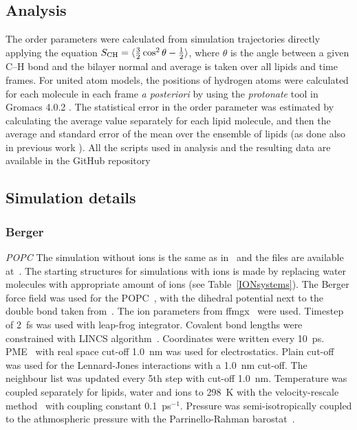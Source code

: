 \documentclass[pre,aps,floatfix,authordate1-4,twocolumn]{revtex4-1}
\begin{document}
\subsection{Analysis}
The order parameters were calculated from simulation trajectories directly applying the equation
$S_{{\rm CH}}=\langle \frac{3}{2}  \cos^2 \theta-\frac{1}{2} \rangle$,
where $\theta$ is the angle between a given C--H bond and the bilayer normal and average is taken
over all lipids and time frames. For united atom models, the positions of hydrogen atoms
were calculated for each molecule in each frame \textit{a posteriori} by using the {\it protonate} tool in 
Gromacs 4.0.2 \cite{gromacsMANUAL402}. 
The statistical error in the order parameter was estimated by calculating the average value separately for each lipid molecule,
and then the average and standard error of the mean over the ensemble of lipids (as done also in previous work \cite{botan15}).
All the scripts used in analysis and the resulting data are available in the GitHub repository \cite{githubIONpaper}

\subsection{Simulation details}

\subsubsection{Berger}
{\it POPC} The simulation without ions is the same as in~\cite{ferreira13} and the files are available at~\cite{bergerFILESpopc}. 
The starting structures for simulations with ions is made by replacing water molecules with appropriate amount of ions (see Table~\ref{IONsystems}).
The Berger force field was used for the POPC~\cite{berger97}, with the dihedral potential next to the double bond 
taken from~\cite{bachar04}. The ion parameters from ffmgx~\cite{straatsma88} were used.
Timestep of 2~fs was used with leap-frog integrator. Covalent bond lengths were constrained with LINCS algorithm~\cite{hess97,hess07}. 
Coordinates were written every 10~ps. PME~\cite{darden93,essman95} with real space cut-off 1.0~nm was used 
for electrostatics. Plain cut-off was used for the Lennard-Jones interactions with a 1.0~nm cut-off.
The neighbour list was updated every 5th step with cut-off 1.0~nm. Temperature was coupled separately
for lipids, water and ions to 298~K with the velocity-rescale method~\cite{bussi07} with coupling constant 0.1~ps$^{-1}$.
Pressure was semi-isotropically coupled to the athmospheric pressure with the Parrinello-Rahman barostat~\cite{parrinello81}.
\end{document}
